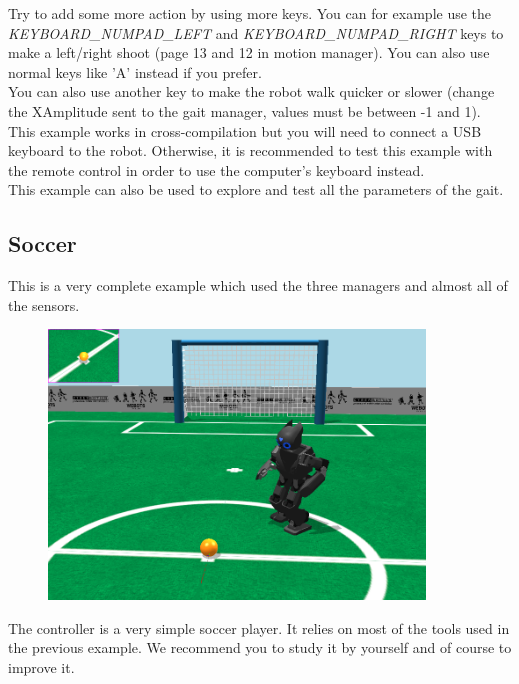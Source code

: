 \documentclass[a4paper, 12pt]{article}  		%
\begin{document}
Try to add some more action by using more keys. You can for example use the \textit{KEYBOARD\_NUMPAD\_LEFT} and \textit{KEYBOARD\_NUMPAD\_RIGHT} keys to make a left/right shoot (page 13 and 12 in motion manager). You can also use normal keys like 'A' instead if you prefer.\\

You can also use another key to make the robot walk quicker or slower (change the XAmplitude sent to the gait manager, values must be between -1 and 1).\\

This example works in cross-compilation but you will need to connect a USB keyboard to the robot. Otherwise, it is recommended to test this example with the remote control in order to use the computer's keyboard instead.\\

This example can also be used to explore and test all the parameters of the gait.\\

\newpage
\subsection{Soccer}

This is a very complete example which used the three managers and almost all of the sensors.\\

\begin{figure}[H]
\begin{center}
\includegraphics[width=10cm]{example_sample.png}
\label{example_sample.png}
\end{center}
\end{figure}

The controller is a very simple soccer player. It relies on most of the tools used in the previous example. We recommend you to study it by yourself and of course to improve it.\\
\end{document}
